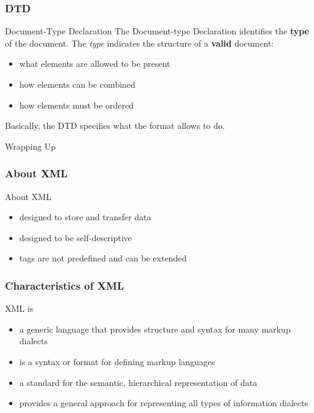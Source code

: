 \documentclass{beamer}\usepackage[]{graphicx}\usepackage[]{color}
\begin{document}

\begin{frame}
\frametitle{DTD}

\begin{block}{Document-Type Declaration}
The Document-type Declaration identifies the \textbf{type} of the document. The \textit{type} indicates the structure of a \textbf{valid} document: 

\begin{itemize}
 \item what elements are allowed to be present
 \item how elements can be combined
 \item how elements must be ordered
\end{itemize}
\end{block}

Basically, the DTD specifies what the format allows to do.
\end{frame}


\begin{frame}
 \begin{center}
  \Huge{\textcolor{mandarina}{Wrapping Up}}
 \end{center}
\end{frame}


\begin{frame}
\frametitle{About XML}

\begin{block}{About XML}
\begin{itemize}
 \item designed to store and transfer data
 \item designed to be self-descriptive
 \item tags are not predefined and can be extended
\end{itemize}
\end{block}

\end{frame}


\begin{frame}
\frametitle{Characteristics of XML}

\begin{block}{XML is}
\begin{itemize}
 \item a generic language that provides structure and syntax for many markup dialects
 \item is a syntax or format for defining markup languages
 \item a standard for the semantic, hierarchical representation of data
 \item provides a general approach for representing all types of information  dialects
\end{itemize}
\end{block}

\end{frame}
\end{document}

